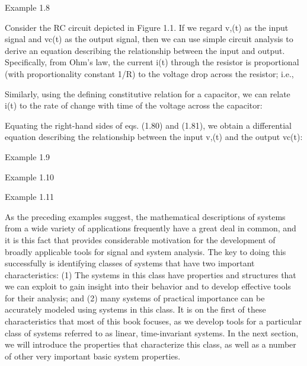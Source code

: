 \documentclass{report}
\begin{document}
Example 1.8

Consider the RC circuit depicted in Figure 1.1. If we regard v,(t) as the input signal and vc(t) as the output signal, then we can use simple circuit
analysis to derive an equation describing the relationship between the input and output. Specifically, from Ohm{'}s law, the current i(t) through
the resistor is proportional (with proportionality constant 1/R) to the voltage drop across the resistor; i.e.,



Similarly, using the defining constitutive relation for a capacitor, we can relate i(t) to the rate of change with time of the voltage across the
capacitor:



Equating the right-hand sides of eqs. (1.80) and (1.81), we obtain a differential equation describing the relationship between the input v,(t) and
the output vc(t):

Example 1.9

Example 1.10

Example 1.11

As the preceding examples suggest, the mathematical descriptions of systems from a wide variety of applications frequently have a great deal in common,
and it is this fact that provides considerable motivation for the development of broadly applicable tools for signal and system analysis. The key
to doing this successfully is identifying classes of systems that have two important characteristics: (1) The systems in this class have properties
and structures that we can exploit to gain insight into their behavior and to develop effective tools for their analysis; and (2) many systems of
practical importance can be accurately modeled using systems in this class. It is on the first of these characteristics that most of this book focuses,
as we develop tools for a particular class of systems referred to as linear, time-invariant systems. In the next section, we will introduce the properties
that characterize this class, as well as a number of other very important basic system properties.
\end{document}
